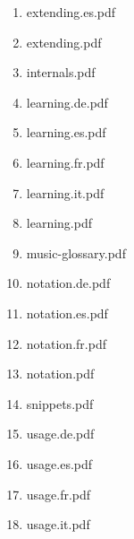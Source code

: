 \documentclass[11pt]{article}
\begin{document}
\begin{enumerate}
\begin{enumerate}
\begin{enumerate}
\begin{enumerate}
\begin{enumerate}
\begin{enumerate}
\begin{enumerate}
\begin{enumerate}
\item extending.es.pdf
\label{sec-1-1-1-1-46-10-3-1-1-1-1-1-1-9}

\item extending.pdf
\label{sec-1-1-1-1-46-10-3-1-1-1-1-1-1-10}

\item internals.pdf
\label{sec-1-1-1-1-46-10-3-1-1-1-1-1-1-11}

\item learning.de.pdf
\label{sec-1-1-1-1-46-10-3-1-1-1-1-1-1-12}

\item learning.es.pdf
\label{sec-1-1-1-1-46-10-3-1-1-1-1-1-1-13}

\item learning.fr.pdf
\label{sec-1-1-1-1-46-10-3-1-1-1-1-1-1-14}

\item learning.it.pdf
\label{sec-1-1-1-1-46-10-3-1-1-1-1-1-1-15}

\item learning.pdf
\label{sec-1-1-1-1-46-10-3-1-1-1-1-1-1-16}

\item music-glossary.pdf
\label{sec-1-1-1-1-46-10-3-1-1-1-1-1-1-17}

\item notation.de.pdf
\label{sec-1-1-1-1-46-10-3-1-1-1-1-1-1-18}

\item notation.es.pdf
\label{sec-1-1-1-1-46-10-3-1-1-1-1-1-1-19}

\item notation.fr.pdf
\label{sec-1-1-1-1-46-10-3-1-1-1-1-1-1-20}

\item notation.pdf
\label{sec-1-1-1-1-46-10-3-1-1-1-1-1-1-21}

\item snippets.pdf
\label{sec-1-1-1-1-46-10-3-1-1-1-1-1-1-22}

\item usage.de.pdf
\label{sec-1-1-1-1-46-10-3-1-1-1-1-1-1-23}

\item usage.es.pdf
\label{sec-1-1-1-1-46-10-3-1-1-1-1-1-1-24}

\item usage.fr.pdf
\label{sec-1-1-1-1-46-10-3-1-1-1-1-1-1-25}

\item usage.it.pdf
\label{sec-1-1-1-1-46-10-3-1-1-1-1-1-1-26}


\end{enumerate}
\end{enumerate}
\end{enumerate}
\end{enumerate}
\end{enumerate}
\end{enumerate}
\end{enumerate}
\end{enumerate}
\end{document}
